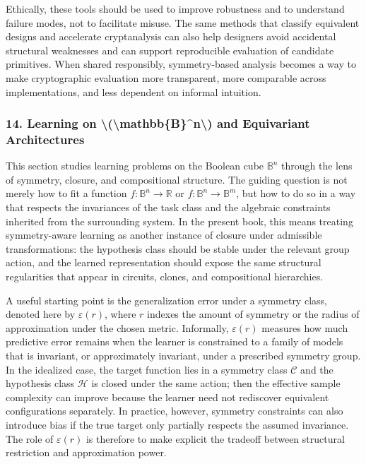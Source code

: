 \documentclass[11pt]{article}
\begin{document}
Ethically, these tools should be used to improve robustness and to understand failure modes, not to facilitate misuse. The same methods that classify equivalent designs and accelerate cryptanalysis can also help designers avoid accidental structural weaknesses and can support reproducible evaluation of candidate primitives. When shared responsibly, symmetry-based analysis becomes a way to make cryptographic evaluation more transparent, more comparable across implementations, and less dependent on informal intuition.



\subsubsection{14. Learning on \textbackslash{}(\textbackslash{}mathbb\{B\}\textasciicircum{}n\textbackslash{}) and Equivariant Architectures}


This section studies learning problems on the Boolean cube \(\mathbb{B}^n\) through the lens of symmetry, closure, and compositional structure. The guiding question is not merely how to fit a function \(f : \mathbb{B}^n \to \mathbb{R}\) or \(f : \mathbb{B}^n \to \mathbb{B}^m\), but how to do so in a way that respects the invariances of the task class and the algebraic constraints inherited from the surrounding system. In the present book, this means treating symmetry-aware learning as another instance of closure under admissible transformations: the hypothesis class should be stable under the relevant group action, and the learned representation should expose the same structural regularities that appear in circuits, clones, and compositional hierarchies.

A useful starting point is the generalization error under a symmetry class, denoted here by \(\varepsilon(r)\), where \(r\) indexes the amount of symmetry or the radius of approximation under the chosen metric. Informally, \(\varepsilon(r)\) measures how much predictive error remains when the learner is constrained to a family of models that is invariant, or approximately invariant, under a prescribed symmetry group. In the idealized case, the target function lies in a symmetry class \(\mathcal{C}\) and the hypothesis class \(\mathcal{H}\) is closed under the same action; then the effective sample complexity can improve because the learner need not rediscover equivalent configurations separately. In practice, however, symmetry constraints can also introduce bias if the true target only partially respects the assumed invariance. The role of \(\varepsilon(r)\) is therefore to make explicit the tradeoff between structural restriction and approximation power.
\end{document}
